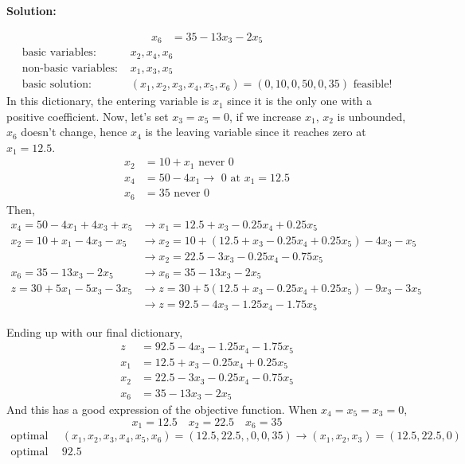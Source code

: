 \documentclass[11pt]{article}
\newenvironment{solution}
  {\par\noindent\textbf{Solution:}\par}
  {\par}
\begin{document}
\begin{solution}
\[\begin{aligned}
    x_6 &= 35-13x_3-2x_5
  \end{aligned}
\]
\[
  \begin{aligned}
    \text{basic variables: } &x_2,x_4,x_6 \\ 
    \text{non-basic variables: } &x_1,x_3,x_5 \\ 
    \text{basic solution: } &(x_1,x_2,x_3,x_4,x_5,x_6) = (0,10,0,50,0,35) \text{ feasible!}
  \end{aligned}
\]
In this dictionary, the entering variable is $x_1$ since it is the only one with a positive coefficient. Now, let's set $x_3=x_5=0$, 
if we increase $x_1$, $x_2$ is unbounded, $x_6$ doesn't change, hence $x_4$ is the leaving variable since it reaches zero at $x_1=12.5$.
\[
  \begin{aligned}
    x_2 &= 10 +x_1 \text{ never 0}\\ 
    x_4 &= 50-4x_1 \to \text{ 0 at }x_1=12.5\\ 
    x_6 &= 35 \text{ never 0}
  \end{aligned}
\]
Then,
\[
  \begin{aligned}
    x_4 = 50-4x_1+4x_3 + x_5 &\to x_1 = 12.5 +x_3 -0.25x_4 + 0.25x_5 \\ 
    x_2 = 10+x_1-4x_3-x_5 &\to x_2 = 10 + (12.5 +x_3 -0.25x_4 + 0.25x_5) -4x_3 -x_5\\ 
    &\to x_2 = 22.5 -3x_3 -0.25x_4 -0.75x_5 \\ 
    x_6 = 35-13x_3-2x_5 &\to x_6  = 35-13x_3-2x_5 \\ 
    z = 30 + 5x_1 - 5x_3 -3x_5 &\to z = 30 +5(12.5+x_3 -0.25x_4 +0.25x_5) - 9x_3-3x_5 \\ 
                               &\to z = 92.5-4x_3 -1.25x_4 -1.75x_5 
  \end{aligned}
\]

Ending up with our final dictionary,
\[
  \begin{aligned}
    z &= 92.5-4x_3 -1.25x_4 -1.75x_5 \\ 
    x_1 &= 12.5 +x_3 -0.25x_4 + 0.25x_5 \\ 
    x_2 &= 22.5 -3x_3 -0.25x_4 -0.75x_5 \\
    x_6 &= 35-13x_3-2x_5
  \end{aligned}
\]
And this has a good expression of the objective function. When $x_4=x_5=x_3=0$, 
\[ x_1 = 12.5  \quad x_2 = 22.5  \quad x_6 = 35 \]
\[
  \begin{aligned}
    \text{optimal solution } &(x_1,x_2,x_3,x_4,x_5,x_6) = (12.5 , 22.5,,0,0,35) \to (x_1,x_2,x_3) = (12.5,22.5,0) \\ 
    \text{optimal value: } &92.5
  \end{aligned}
\]
\end{solution}
\end{document}
